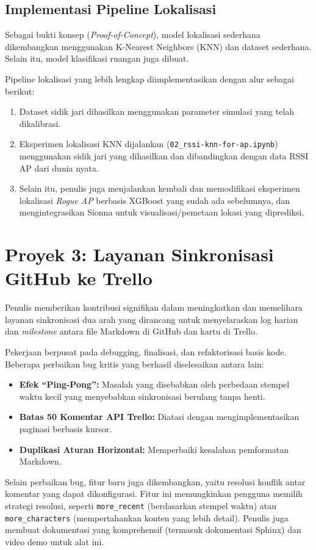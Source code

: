 \subsection{Implementasi Pipeline Lokalisasi}
Sebagai bukti konsep (\textit{Proof-of-Concept}), model lokalisasi sederhana dikembangkan menggunakan K-Nearest Neighbors (KNN) dan dataset sederhana. Selain itu, model klasifikasi ruangan juga dibuat.

Pipeline lokalisasi yang lebih lengkap diimplementasikan dengan alur sebagai berikut:
\begin{enumerate}
    \item Dataset sidik jari dihasilkan menggunakan parameter simulasi yang telah dikalibrasi.
    \item Eksperimen lokalisasi KNN dijalankan (\texttt{02\_rssi-knn-for-ap.ipynb}) menggunakan sidik jari yang dihasilkan dan dibandingkan dengan data RSSI AP dari dunia nyata.
    \item Selain itu, penulis juga menjalankan kembali dan memodifikasi eksperimen lokalisasi \textit{Rogue AP} berbasis XGBoost yang sudah ada sebelumnya, dan mengintegrasikan Sionna untuk visualisasi/pemetaan lokasi yang diprediksi.
\end{enumerate}

\section{Proyek 3: Layanan Sinkronisasi GitHub ke Trello}
Penulis memberikan kontribusi signifikan dalam meningkatkan dan memelihara layanan sinkronisasi dua arah yang dirancang untuk menyelaraskan log harian dan \textit{milestone} antara file Markdown di GitHub dan kartu di Trello.

Pekerjaan berpusat pada debugging, finalisasi, dan refaktorisasi basis kode. Beberapa perbaikan bug kritis yang berhasil diselesaikan antara lain:
\begin{itemize}
    \item \textbf{Efek ``Ping-Pong'':} Masalah yang disebabkan oleh perbedaan stempel waktu kecil yang menyebabkan sinkronisasi berulang tanpa henti.
    \item \textbf{Batas 50 Komentar API Trello:} Diatasi dengan mengimplementasikan paginasi berbasis kursor.
    \item \textbf{Duplikasi Aturan Horizontal:} Memperbaiki kesalahan pemformatan Markdown.
\end{itemize}
Selain perbaikan bug, fitur baru juga dikembangkan, yaitu resolusi konflik antar komentar yang dapat dikonfigurasi. Fitur ini memungkinkan pengguna memilih strategi resolusi, seperti \texttt{more\_recent} (berdasarkan stempel waktu) atau \texttt{more\_characters} (mempertahankan konten yang lebih detail). Penulis juga membuat dokumentasi yang komprehensif (termasuk dokumentasi Sphinx) dan video demo untuk alat ini.

